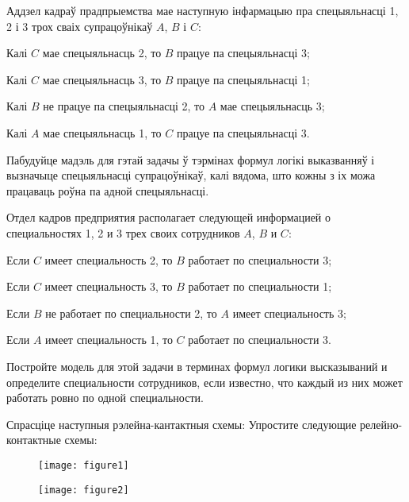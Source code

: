 \begin{problemList}
\problemItemSimple
{Аддзел кадраў прадпрыемства мае наступную інфармацыю пра спецыяльнасці 1, 2 і 3 трох сваіх супрацоўнікаў $A$, $B$ і $C$:
\begin{belarusianEnumerate}
	\item Калі $C$ мае спецыяльнасць 2, то $B$ працуе па спецыяльнасці 3;
	\item Калі $C$ мае спецыяльнасць 3, то $B$ працуе па спецыяльнасці 1;
	\item Калі $B$ не працуе па спецыяльнасці 2, то $A$ мае спецыяльнасць 3;
	\item Калі $A$ мае спецыяльнасць 1, то $C$ працуе па спецыяльнасці 3.
\end{belarusianEnumerate}
Пабудуйце мадэль для гэтай задачы ў тэрмінах формул логікі выказванняў і вызначыце спецыяльнасці супрацоўнікаў, калі вядома, што кожны з іх можа працаваць роўна па адной спецыяльнасці.}
{Отдел кадров предприятия располагает следующей информацией о специальностях 1, 2 и 3 трех своих сотрудников $A$, $B$ и $C$:
\begin{russianEnumerate}
	\item Если $C$ имеет специальность 2, то $B$ работает по специальности 3;
	\item Если $C$ имеет специальность 3, то $B$ работает по специальности 1;
	\item Если $B$ не работает по специальности 2, то $A$ имеет специальность 3;
	\item Если $A$ имеет специальность 1, то $C$ работает по специальности 3.
\end{russianEnumerate}
Постройте модель для этой задачи в терминах формул логики высказываний и определите  специальности сотрудников, если известно, что каждый из них может работать ровно по  одной специальности.}

\bigskip

\problemItemWithCommonPart
{Спрасціце наступныя рэлейна-кантактныя схемы:}
{Упростите следующие релейно-контактные схемы:}
{%
\begin{figure}[H]
	\begin{center}
		\texttt{[image: figure1]}
	\end{center}
\end{figure}

\begin{figure}[H]
	\begin{center}
		\texttt{[image: figure2]}
	\end{center}
\end{figure}
}
\bigskip


\end{problemList}
